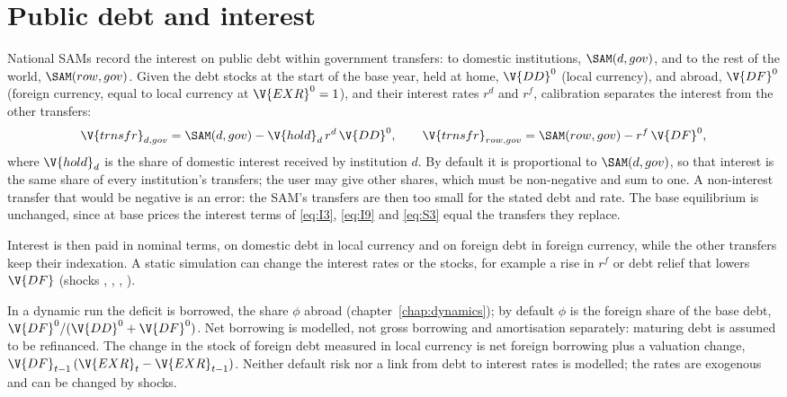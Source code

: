 \section{Public debt and interest}\label{sec:debt}

National SAMs record the interest on public debt within government
transfers: to domestic institutions, $\SAM(d, gov)$, and to the rest of the
world, $\SAM(row, gov)$. Given the debt stocks at the start of the base year,
held at home, $\V{DD}^0$ (local currency), and abroad, $\V{DF}^0$ (foreign
currency, equal to local currency at $\V{EXR}^0 = 1$), and their interest
rates $r^d$ and $r^f$, calibration separates the interest from the other
transfers:
\begin{equation*}
\V{trnsfr}_{d,gov} = \SAM(d, gov) - \V{hold}_d\,r^d\,\V{DD}^0,
\qquad
\V{trnsfr}_{row,gov} = \SAM(row, gov) - r^f\,\V{DF}^0,
\end{equation*}
where $\V{hold}_d$ is the share of domestic interest received by institution
$d$. By default it is proportional to $\SAM(d, gov)$, so that interest is the
same share of every institution's transfers; the user may give other shares,
which must be non-negative and sum to one. A non-interest transfer that would
be negative is an error: the SAM's transfers are then too small for the stated
debt and rate. The base equilibrium is unchanged, since at base prices the
interest terms of \eqref{eq:I3}, \eqref{eq:I9} and \eqref{eq:S3} equal the
transfers they replace.

Interest is then paid in nominal terms, on domestic debt in local currency and
on foreign debt in foreign currency, while the other transfers keep their
indexation. A static simulation can change the interest rates or the stocks,
for example a rise in $r^f$ or debt relief that lowers $\V{DF}$ (shocks
, , , ).

In a dynamic run the deficit is borrowed, the share $\phi$ abroad
(chapter~\ref{chap:dynamics}); by default $\phi$ is the foreign share of the
base debt, $\V{DF}^0 / (\V{DD}^0 + \V{DF}^0)$. Net borrowing is modelled, not
gross borrowing and amortisation separately: maturing debt is assumed to be
refinanced. The change in the stock of foreign debt measured in local currency
is net foreign borrowing plus a valuation change,
$\V{DF}_{t-1}\,(\V{EXR}_t - \V{EXR}_{t-1})$. Neither default risk nor a link
from debt to interest rates is modelled; the rates are exogenous and can be
changed by shocks.
